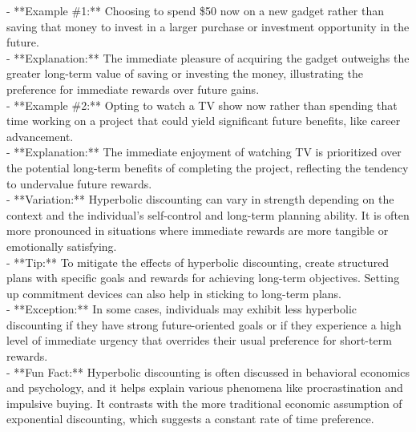 \documentclass[a4paper,12pt,single,pdftex]{scrbook}
\begin{document}
    
      - **Example \#1:** Choosing to spend \$50 now on a new gadget rather than saving that money to invest in a larger purchase or investment opportunity in the future.
    \\

    
      - **Explanation:** The immediate pleasure of acquiring the gadget outweighs the greater long-term value of saving or investing the money, illustrating the preference for immediate rewards over future gains.
    \\

    
      - **Example \#2:** Opting to watch a TV show now rather than spending that time working on a project that could yield significant future benefits, like career advancement.
    \\

    
      - **Explanation:** The immediate enjoyment of watching TV is prioritized over the potential long-term benefits of completing the project, reflecting the tendency to undervalue future rewards.
    \\

    
      - **Variation:** Hyperbolic discounting can vary in strength depending on the context and the individual’s self-control and long-term planning ability. It is often more pronounced in situations where immediate rewards are more tangible or emotionally satisfying.
    \\

    
      - **Tip:** To mitigate the effects of hyperbolic discounting, create structured plans with specific goals and rewards for achieving long-term objectives. Setting up commitment devices can also help in sticking to long-term plans.
    \\

    
      - **Exception:** In some cases, individuals may exhibit less hyperbolic discounting if they have strong future-oriented goals or if they experience a high level of immediate urgency that overrides their usual preference for short-term rewards.
    \\

    
      - **Fun Fact:** Hyperbolic discounting is often discussed in behavioral economics and psychology, and it helps explain various phenomena like procrastination and impulsive buying. It contrasts with the more traditional economic assumption of exponential discounting, which suggests a constant rate of time preference.
    \\

  
\end{document}
